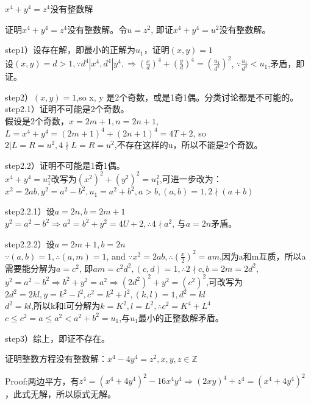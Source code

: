 \documentclass[UTF8]{../09-Mathematics}
\begin{document}
\begin{proposition}
    $x^4 + y^4 = z^4$没有整数解
\end{proposition}
证明$x^4 + y^4 = z^4$没有整数解。令$u = z^2$, 即证$x^4 + y^4 = u^2$没有整数解。

step1）设存在解，即最小的正解为$u_1$，证明$(x,y) = 1$\\
设$(x,y) =d> 1, \because d^4|x^4, d^4|y^4, \Rightarrow (\frac{x}{d})^4+(\frac{y}{d})^4=(\frac{u_1}{d^2})^2 $, $ \because \frac{u_1}{d^2} < u_1$,矛盾，即证。

step2）$(x,y) = 1$,so x, y 是2个奇数，或是1奇1偶。分类讨论都是不可能的。\\

step2.1）证明不可能是2个奇数。\\
假设是2个奇数，$x = 2m+1, n=2n+1$, $L = x^4 + y^4 = (2m+1)^4 + (2n+1)^4 = 4T+2$, so $2|L= R = u^2, 4\nmid L= R = u^2$,不存在这样的u，所以不能是2个奇数。

step2.2）证明不可能是1奇1偶。\\
$x^4 + y^4 = u_1^2$改写为$(x^2)^2 + (y^2)^2 = u_1^2$,可进一步改为：
$x^2 = 2ab, y^2 = a^2-b^2, u_1 = a^2 + b^2, a>b, (a,b) = 1, 2\nmid (a+b)$

step2.2.1）设$a=2n, b=2m+1$ \\
$y^2 = a^2-b^2 \Rightarrow a^2  = b^2 + y^2 = 4U+2, \therefore 4 \nmid a^2$, 与$a=2n$矛盾。

step2.2.2）设$a=2m+1, b=2n$ \\
$\because (a,b) = 1, \therefore (a,m) = 1$, and $\because x^2 = 2ab,\therefore (\frac{x}{2})^2 = am$,因为a和m互质，所以a需要能分解为$a = c^2$, 即$am = c^2 d^2, (c,d) = 1, \therefore 2 \nmid c, b=2m = 2d^2$, \\
$y^2 = a^2-b^2 \Rightarrow b^2 + y^2 = a^2   \Rightarrow (2d^2)^2 + y^2= (c^2)^2 $,可改写为$2d^2 = 2kl, y=k^2-l^2, c^2 = k^2+l^2, (k,l)=1, d^2 = kl$\\
$d^2 = kl$,所以k和l可分解为$k = K^2, l=L^2, \therefore c^2 = K^4 + L^4$\\
$c \leqslant c^2 = a\leqslant a^2<a^2+b^2 = u_1 $,与$u_1$最小的正整数解矛盾。

step3）综上，即证不存在。


\begin{proposition}
    证明整数方程没有整数解：$x^4-4y^4 = z^2, x,y,z \in \mathbb Z$

    Proof:两边平方，有$z^4 = (x^4+4y^4)^2 - 16x^4y^4 \Rightarrow (2xy)^4 + z^4 = (x^4+4y^4)^2$，此式无解，所以原式无解。
\end{proposition}
\end{document}
